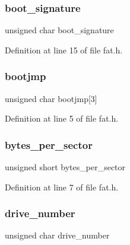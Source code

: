 \subsubsection{\texorpdfstring{boot\+\_\+signature}{boot\_signature}}
{\footnotesize\ttfamily unsigned char boot\+\_\+signature}



Definition at line 15 of file fat.\+h.

\mbox{\label{a00152_a9d09d7d5af910f75a499a71fc8db1cb1_a9d09d7d5af910f75a499a71fc8db1cb1}} 
\subsubsection{\texorpdfstring{bootjmp}{bootjmp}}
{\footnotesize\ttfamily unsigned char bootjmp\mbox{[}3\mbox{]}}



Definition at line 5 of file fat.\+h.

\mbox{\label{a00152_a383840c631d2e9d53e46b6bc5d17c3eb_a383840c631d2e9d53e46b6bc5d17c3eb}} 
\subsubsection{\texorpdfstring{bytes\+\_\+per\+\_\+sector}{bytes\_per\_sector}}
{\footnotesize\ttfamily unsigned short bytes\+\_\+per\+\_\+sector}



Definition at line 7 of file fat.\+h.

\mbox{\label{a00152_ace7cd596c41a03630b828ad71042c645_ace7cd596c41a03630b828ad71042c645}} 
\subsubsection{\texorpdfstring{drive\+\_\+number}{drive\_number}}
{\footnotesize\ttfamily unsigned char drive\+\_\+number}



